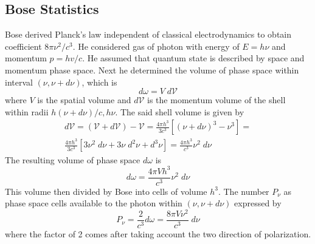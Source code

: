 \documentclass[../../../Main.tex]{subfiles}
\begin{document}
\subsection*{Bose Statistics}
Bose derived Planck's law independent of classical electrodynamics to obtain coefficient $8\pi \nu^2/c^3$. He considered gas of photon with energy of $E=h\nu$ and momentum $p=hv/c$. He assumed that quantum state is described by space and momentum phase space. Next he determined the volume of phase space within interval $(\nu,\nu+d\nu)$, which is
\begin{equation*}
    d\omega=V\;d\mathcal{V}
\end{equation*}
where $V$ is the spatial volume and $d\mathcal{V}$ is the momentum volume of the shell within radii $h(\nu+d\nu)/c,h\nu$. The said shell volume is given by
\begin{multline*}
    d\mathcal{V}=(\mathcal{V}+d\mathcal{V})-\mathcal{V}=\frac{4\pi h^3}{3c^3}\left[(\nu+d\nu)^3-\nu^3\right] =\\ \frac{4\pi h^3}{3c^3}\left[3\nu^2\;d\nu+3\nu\;d^2\nu+d^3\nu\right]=\frac{4\pi h^3}{c^3}\nu^2\;d\nu
\end{multline*}
The resulting volume of phase space $d\omega$ is
\begin{equation*}
    d\omega=\frac{4\pi V h^3}{c^3}\nu^2\;d\nu
\end{equation*}
This volume then divided by Bose into cells of volume $h^3$. The number $P_\nu$ as phase space cells available to the photon within $(\nu,\nu+d\nu)$ expressed by
\begin{equation*}
    P_\nu=\frac{2}{c^3}d\omega=\frac{8\pi V\nu^2}{c^3}\;d\nu
\end{equation*}
where the factor of 2 comes after taking account the two direction of polarization. 
\end{document}
